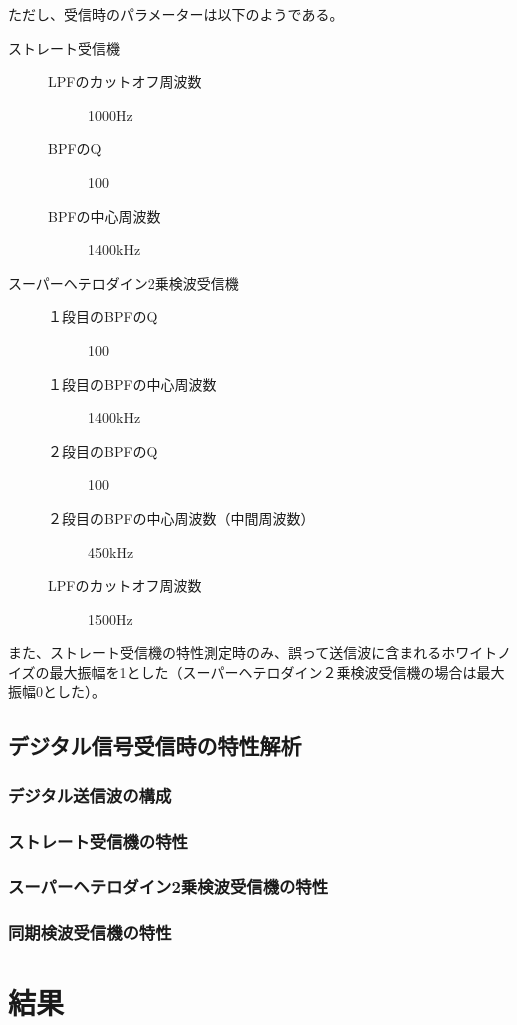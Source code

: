 \documentclass[11pt]{ltjsarticle}
\begin{document}
			ただし、受信時のパラメーターは以下のようである。
			\begin{description}
				\item[ストレート受信機] \mbox{}
					\begin{description}
						\item[LPFのカットオフ周波数] 1000Hz
						\item[BPFのQ] 100
						\item[BPFの中心周波数] 1400kHz
					\end{description}
				\item[スーパーヘテロダイン2乗検波受信機] \mbox{}
					\begin{description}
						\item[１段目のBPFのQ] 100
						\item[１段目のBPFの中心周波数] 1400kHz
						\item[２段目のBPFのQ] 100
						\item[２段目のBPFの中心周波数（中間周波数）] 450kHz
						\item[LPFのカットオフ周波数] 1500Hz
					\end{description}
			\end{description}
			また、ストレート受信機の特性測定時のみ、誤って送信波に含まれるホワイトノイズの最大振幅を1とした（スーパーヘテロダイン２乗検波受信機の場合は最大振幅0とした）。

	\subsection{デジタル信号受信時の特性解析}
		\subsubsection{デジタル送信波の構成}
		\subsubsection{ストレート受信機の特性}
		\subsubsection{スーパーヘテロダイン2乗検波受信機の特性}
		\subsubsection{同期検波受信機の特性}

\section{結果} %
\end{document}
